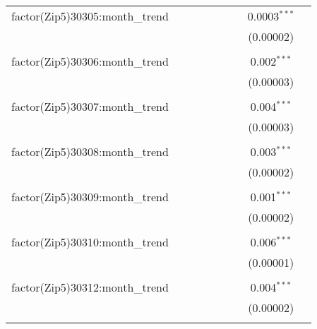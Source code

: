 \begin{table}[H]
{\begin{tabular}{@{\extracolsep{5pt}}lcccccccc}
  factor(Zip5)30305:month\_trend &  &  &  &  &  &  & 0.0003$^{***}$ &  \\  

   &  &  &  &  &  &  & (0.00002) &  \\  

   & & & & & & & & \\  

  factor(Zip5)30306:month\_trend &  &  &  &  &  &  & 0.002$^{***}$ &  \\  

   &  &  &  &  &  &  & (0.00003) &  \\  

   & & & & & & & & \\  

  factor(Zip5)30307:month\_trend &  &  &  &  &  &  & 0.004$^{***}$ &  \\  

   &  &  &  &  &  &  & (0.00003) &  \\  

   & & & & & & & & \\  

  factor(Zip5)30308:month\_trend &  &  &  &  &  &  & 0.003$^{***}$ &  \\  

   &  &  &  &  &  &  & (0.00002) &  \\  

   & & & & & & & & \\  

  factor(Zip5)30309:month\_trend &  &  &  &  &  &  & 0.001$^{***}$ &  \\  

   &  &  &  &  &  &  & (0.00002) &  \\  

   & & & & & & & & \\  

  factor(Zip5)30310:month\_trend &  &  &  &  &  &  & 0.006$^{***}$ &  \\  

   &  &  &  &  &  &  & (0.00001) &  \\  

   & & & & & & & & \\  

  factor(Zip5)30312:month\_trend &  &  &  &  &  &  & 0.004$^{***}$ &  \\  

   &  &  &  &  &  &  & (0.00002) &  \\  

   & & & & & & & & \\  


\end{tabular}}
\end{table}
